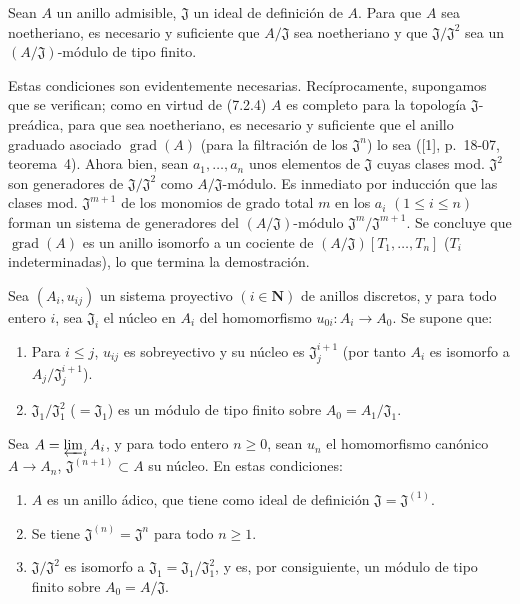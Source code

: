 \begin{corollary}[7.2.6]
\label{0.7.2.6-fr}
Sean $A$ un anillo admisible, $\mathfrak J$ un ideal de definición de $A$.
Para que $A$ sea noetheriano, es necesario y suficiente que $A/\mathfrak J$ sea
noetheriano y que $\mathfrak J/\mathfrak J^2$ sea un
$(A/\mathfrak J)$-módulo de tipo finito.
\end{corollary}

Estas condiciones son evidentemente necesarias. Recíprocamente, supongamos que se
verifican; como en virtud de (7.2.4) $A$ es completo para la topología
$\mathfrak J$-preádica, para que sea noetheriano, es necesario y suficiente que
el anillo graduado asociado $\operatorname{grad}(A)$ (para la filtración de los
$\mathfrak J^n$) lo sea ([1], p.~18-07, teorema~4). Ahora bien, sean
$a_1,\ldots,a_n$ unos elementos de $\mathfrak J$ cuyas clases mod.
$\mathfrak J^2$ son generadores de $\mathfrak J/\mathfrak J^2$ como
$A/\mathfrak J$-módulo. Es inmediato por inducción que las clases mod.
$\mathfrak J^{m+1}$ de los monomios de grado total $m$ en los $a_i$
$(1\leq i\leq n)$ forman un sistema de generadores del
$(A/\mathfrak J)$-módulo $\mathfrak J^m/\mathfrak J^{m+1}$. Se concluye que
$\operatorname{grad}(A)$ es un anillo isomorfo a un cociente de
$(A/\mathfrak J)[T_1,\ldots,T_n]$ ($T_i$ indeterminadas), lo que termina la
demostración.

\begin{proposition}[7.2.7]
\label{0.7.2.7-fr}
Sea $(A_i,u_{ij})$ un sistema proyectivo $(i\in\mathbf N)$ de anillos discretos,
y para todo entero $i$, sea $\mathfrak J_i$ el núcleo en $A_i$ del
homomorfismo $u_{0i}:A_i\to A_0$. Se supone que:
\begin{enumerate}
  \item[{\upshape a)}] Para $i\leq j$, $u_{ij}$ es sobreyectivo y su núcleo es
    $\mathfrak J_j^{i+1}$ \textup{(por tanto $A_i$ es isomorfo a
    $A_j/\mathfrak J_j^{i+1}$)}.
  \item[{\upshape b)}] $\mathfrak J_1/\mathfrak J_1^2$ ($=\mathfrak J_1$) es un
    módulo de tipo finito sobre $A_0=A_1/\mathfrak J_1$.
\end{enumerate}
Sea $A=\varprojlim_i A_i$, y para todo entero $n\geq0$, sean $u_n$
el homomorfismo canónico $A\to A_n$, $\mathfrak J^{(n+1)}\subset A$ su
núcleo. En estas condiciones:
\begin{enumerate}
  \item[{\upshape(i)}] $A$ es un anillo ádico, que tiene como ideal de definición
    $\mathfrak J=\mathfrak J^{(1)}$.
  \item[{\upshape(ii)}] Se tiene $\mathfrak J^{(n)}=\mathfrak J^n$ para todo $n\geq1$.
  \item[{\upshape(iii)}] $\mathfrak J/\mathfrak J^2$ es isomorfo a
    $\mathfrak J_1=\mathfrak J_1/\mathfrak J_1^2$, y es, por consiguiente, un módulo
    de tipo finito sobre $A_0=A/\mathfrak J$.
\end{enumerate}
\end{proposition}

